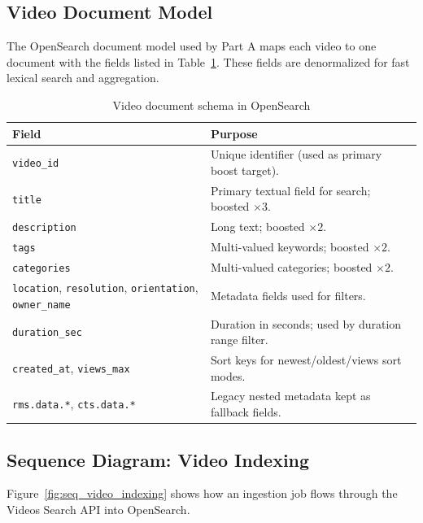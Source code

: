 \subsection{Video Document Model}

The OpenSearch document model used by Part A maps each video to one document with the fields
listed in Table~\ref{tab:video_doc}. These fields are denormalized for fast lexical search and
aggregation.

\begin{table}[H]
\centering
\caption{Video document schema in OpenSearch}
\label{tab:video_doc}
\small
\begin{tabularx}{\textwidth}{lX}
\toprule
\textbf{Field} & \textbf{Purpose} \\
\midrule
\texttt{video\_id}             & Unique identifier (used as primary boost target). \\
\texttt{title}                 & Primary textual field for search; boosted $\times 3$. \\
\texttt{description}           & Long text; boosted $\times 2$. \\
\texttt{tags}                  & Multi-valued keywords; boosted $\times 2$. \\
\texttt{categories}            & Multi-valued categories; boosted $\times 2$. \\
\texttt{location}, \texttt{resolution}, \texttt{orientation}, \texttt{owner\_name} & Metadata fields used for filters. \\
\texttt{duration\_sec}         & Duration in seconds; used by duration range filter. \\
\texttt{created\_at}, \texttt{views\_max} & Sort keys for newest/oldest/views sort modes. \\
\texttt{rms.data.*}, \texttt{cts.data.*} & Legacy nested metadata kept as fallback fields. \\
\bottomrule
\end{tabularx}
\normalsize
\end{table}

\subsection{Sequence Diagram: Video Indexing}

Figure~\ref{fig:seq_video_indexing} shows how an ingestion job flows through the Videos Search
API into OpenSearch.

